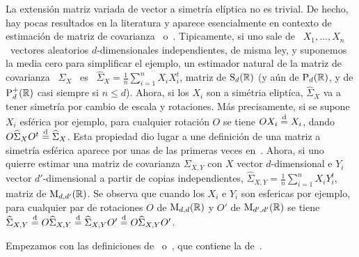 La  extensi\'on  matriz  variada  de   vector  a  simetr\'ia  el\'iptica  no  es
trivial. De hecho, hay pocas resultados en la literatura y aparece esencialmente
en  contexto de estimaci\'on  de matriz  de covarianza~\cite[\S.~13.2]{BilBre99}
o~\cite{Mal61,   Tyl82,  GruRoc90,   GupVar94,   GupVar95,  gupNag99,   FanLi99,
  CarGon16}.   Tipicamente, si  uno  sale de  \  $X_1, \ldots,  X_n$ \  vectores
aleatorios $d$-dimensionales independientes, de  misma ley, y suponemos la media
cero  para  simplificar  el  ejemplo,  un  estimador natural  de  la  matriz  de
covarianza \  $\Sigma_X$ \ es \ $\displaystyle  \widehat{\Sigma}_X = \frac{1}{n}
\sum_{i=1}^n X_i X_i^t$, matriz  de $\mathrm{S}_d(\mathbb{R})$ (y a\'un de $\mathrm{P}_d(\mathbb{R})$,
y de  $\mathrm{P}_d^+(\mathbb{R})$ casi siempre si  $n \le d$).  Ahora, si los $X_i$  son a
sim\'etria elipt\'ica, $\widehat{\Sigma}_X$ va  a tener simetr\'ia por cambio de
escala  y rotaciones.  M\'as precisamente,  si  se supone  $X_i$ esf\'erica  por
ejemplo, para  cualquier rotaci\'on $O$  se tiene $O  X_i \stackrel{\mathrm{d}}{=} X_i$,  dando $O
\widehat{\Sigma}_X O^t  \stackrel{\mathrm{d}}{=} \widehat{\Sigma}_X$.  Esta propiedad  dio lugar a
une definici\'on de  una matriz a simetr\'ia esf\'erica aparece  por unas de las
primeras veces  en~\cite{Mal61}.  Ahora,  si uno quierre  estimar una  matriz de
covarianza  $\Sigma_{X,Y}$  con  $X$   vector  $d$-dimensional  e  $Y_i$  vector
$d'$-dimensional   a    partir   de   copias    independientes,   $\displaystyle
\widehat{\Sigma}_{X,Y}  =   \frac{1}{n}  \sum_{i=1}^n  X_i   Y_i^t$,  matriz  de
$\mathrm{M}_{d,d'}(\mathbb{R})$. Se observa que cuando  los $X_i$ e $Y_i$ son esfericas por
ejemplo, para cualquier  par de rotaciones $O$ de  $\mathrm{M}_{d,d}(\mathbb{R})$ y $O'$ de
$\mathrm{M}_{d',d'}(\mathbb{R})$     se    tiene    $\widehat{\Sigma}_{X,Y}     \stackrel{\mathrm{d}}{=}    O
\widehat{\Sigma}_{X,Y}    \stackrel{\mathrm{d}}{=}     \widehat{\Sigma}_{X,Y}    O'    \stackrel{\mathrm{d}}{=}    O
\widehat{\Sigma}_{X,Y} O'$.

Empezamos con las  definiciones de~\cite[\S~9.3]{GupNag99} o~\cite{Daw77, Daw78,
  Daw81, FanChe84}, que contiene la de~\cite{Mal61, Tyl82}.

